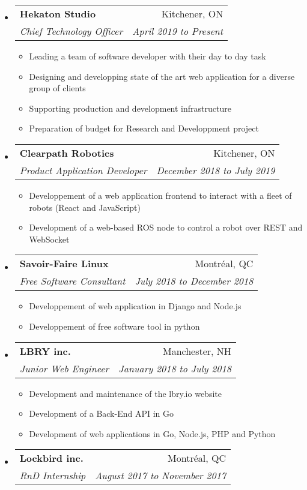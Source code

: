 \documentclass[letterpaper,11pt]{article}
\makeatletter
\newcommand{\ressubheading}[4]{
	\begin{tabular*}{6.5in}{l@{\cftdotfill{\cftsecdotsep}\extracolsep{\fill}}r}
		\textbf{#1} & #2 \\
		\textit{#3} & \textit{#4} \\
	\end{tabular*}\vspace{-6pt}}
\makeatother
\begin{document}
	\begin{itemize}
		\item
			\ressubheading{Hekaton Studio}{Kitchener, ON}{Chief Technology Officer}{April 2019 to Present}
			\begin{itemize}
				\item Leading a team of software developer with their day to day task
				\item Designing and developping state of the art web application for a diverse group of clients
				\item Supporting production and development infrastructure
				\item Preparation of budget for Research and Developpment project
			\end{itemize}
		
		\item
			\ressubheading{Clearpath Robotics}{Kitchener, ON}{Product Application Developer }{December 2018 to July 2019}
			\begin{itemize}
				\item Developpement of a web application frontend to interact with a fleet of robots (React and JavaScript)
				\item Development of a web-based ROS node to control a robot over REST and WebSocket
			\end{itemize}
		\item
			\ressubheading{Savoir-Faire Linux}{Montréal, QC}{Free Software Consultant}{July 2018 to December 2018}
			
			\begin{itemize}
				\item Developpement of web application in Django and Node.js 
				\item Developpement of free software tool in python
			\end{itemize}
		
		\item
			\ressubheading{LBRY inc.}{Manchester, NH}{Junior Web Engineer}{January 2018 to July 2018}
			
			\begin{itemize}
				\item Development and maintenance of the lbry.io website
				\item Development of a Back-End API in Go
				\item Development of web applications in Go, Node.js, PHP and Python
			\end{itemize}
		
		\item 
			\ressubheading{Lockbird inc.}{Montréal, QC}{RnD Internship}{August 2017 to November 2017}
			

\end{itemize}
\end{document}
